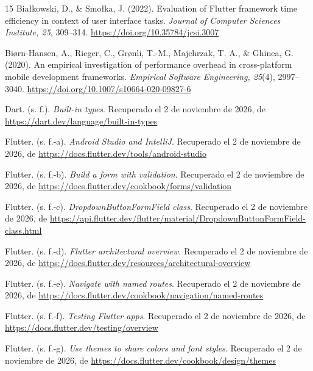 \documentclass[12pt,letterpaper]{article}
\begin{document}
\begin{thebibliography}{15}
Bia{\l}kowski, D., \& Smo{\l}ka, J. (2022). Evaluation of Flutter framework time efficiency in context of user interface tasks. \textit{Journal of Computer Sciences Institute, 25}, 309--314. \url{https://doi.org/10.35784/jcsi.3007}

Bi{\o}rn-Hansen, A., Rieger, C., Gr{\o}nli, T.-M., Majchrzak, T. A., \& Ghinea, G. (2020). An empirical investigation of performance overhead in cross-platform mobile development frameworks. \textit{Empirical Software Engineering, 25}(4), 2997--3040. \url{https://doi.org/10.1007/s10664-020-09827-6}

Dart. (s. f.). \textit{Built-in types}. Recuperado el 2 de noviembre de 2026, de \url{https://dart.dev/language/built-in-types}

Flutter. (s. f.-a). \textit{Android Studio and IntelliJ}. Recuperado el 2 de noviembre de 2026, de \url{https://docs.flutter.dev/tools/android-studio}

Flutter. (s. f.-b). \textit{Build a form with validation}. Recuperado el 2 de noviembre de 2026, de \url{https://docs.flutter.dev/cookbook/forms/validation}

Flutter. (s. f.-c). \textit{DropdownButtonFormField class}. Recuperado el 2 de noviembre de 2026, de \url{https://api.flutter.dev/flutter/material/DropdownButtonFormField-class.html}

Flutter. (s. f.-d). \textit{Flutter architectural overview}. Recuperado el 2 de noviembre de 2026, de \url{https://docs.flutter.dev/resources/architectural-overview}

Flutter. (s. f.-e). \textit{Navigate with named routes}. Recuperado el 2 de noviembre de 2026, de \url{https://docs.flutter.dev/cookbook/navigation/named-routes}

Flutter. (s. f.-f). \textit{Testing Flutter apps}. Recuperado el 2 de noviembre de 2026, de \url{https://docs.flutter.dev/testing/overview}

Flutter. (s. f.-g). \textit{Use themes to share colors and font styles}. Recuperado el 2 de noviembre de 2026, de \url{https://docs.flutter.dev/cookbook/design/themes}


\end{thebibliography}
\end{document}
